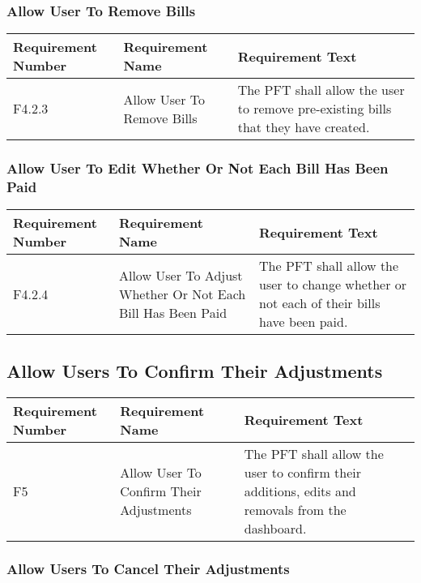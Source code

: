 \documentclass{article}
\begin{document}
\subsubsection{Allow User To Remove Bills}

\begin{longtable}{|p{2cm}|p{6cm}| p{6cm}|}
    \hline
    \textbf{Requirement Number} & \textbf{Requirement Name} & \textbf{Requirement Text}\\
    \hline
    F4.2.3 & Allow User To Remove Bills & The PFT shall allow the user to remove pre-existing bills that they have created.  \\
    \hline
\end{longtable}

\subsubsection{Allow User To Edit Whether Or Not Each Bill Has Been Paid}

\begin{longtable}{|p{2cm}|p{6cm}| p{6cm}|}
    \hline
    \textbf{Requirement Number} & \textbf{Requirement Name} & \textbf{Requirement Text}\\
    \hline
    F4.2.4 & Allow User To Adjust Whether Or Not Each Bill Has Been Paid & The PFT shall allow the user to change whether or not each of their bills have been paid.  \\
    \hline
\end{longtable}

\subsection{Allow Users To Confirm Their Adjustments}

\begin{longtable}{|p{2cm}|p{6cm}| p{6cm}|}
    \hline
    \textbf{Requirement Number} & \textbf{Requirement Name} & \textbf{Requirement Text}\\
    \hline
    F5 & Allow User To Confirm Their Adjustments & The PFT shall allow the user to confirm their additions, edits and removals from the dashboard.  \\
    \hline
\end{longtable}

\subsubsection{Allow Users To Cancel Their Adjustments}
\end{document}
